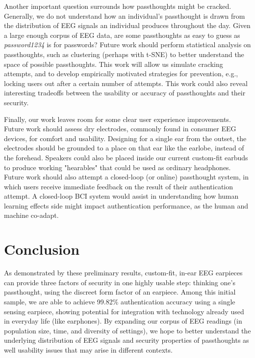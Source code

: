 \documentclass{sigchi}
\begin{document}
Another important question surrounds how passthoughts might be cracked. Generally, we do not understand how an individual's passthought is drawn from the distribution of EEG signals an individual produces throughout the day. Given a large enough corpus of EEG data, are some passthoughts as easy to guess as \textit{password1234} is for passwords? Future work should perform statistical analysis on passthoughts, such as clustering (perhaps with t-SNE) to better understand the space of possible passthoughts. This work will allow us simulate cracking attempts, and to develop empirically motivated strategies for prevention, e.g., locking users out after a certain number of attempts. This work could also reveal interesting tradeoffs between the usability or accuracy of passthoughts and their security.

Finally, our work leaves room for some clear user experience improvements. Future work should assess dry electrodes, commonly found in consumer EEG devices, for comfort and usability. Designing for a single ear from the outset, the electrodes should be grounded to a place on that ear like the earlobe, instead of the forehead. Speakers could also be placed inside our current custom-fit earbuds to produce working "hearables" that could be used as ordinary headphones. Future work should also attempt a closed-loop (or online) passthought system, in which users receive immediate feedback on the result of their authentication attempt. A closed-loop BCI system would assist in understanding how human learning effects side might impact authentication performance, as the human and machine co-adapt.

\section{Conclusion}

As demonstrated by these preliminary results, custom-fit, in-ear EEG earpieces can provide three factors of security in one highly usable step: thinking one's passthought, using the discreet form factor of an earpiece. Among this initial sample, we are able to achieve 99.82\% authentication accuracy using a single sensing earpiece, showing potential for integration with technology already used in everyday life (like earphones). By expanding our corpus of EEG readings (in population size, time, and diversity of settings), we hope to better understand the underlying distribution of EEG signals and security properties of passthoughts as well usability issues that may arise in different contexts.
\end{document}
